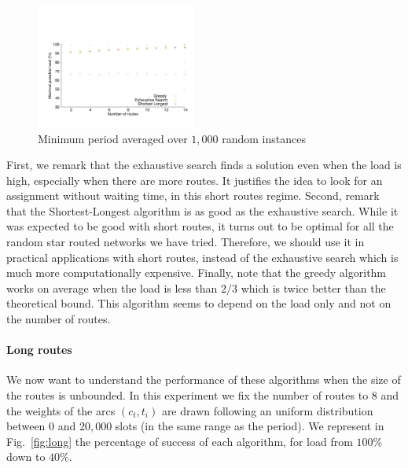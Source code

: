 \documentclass[10pt, conference, letterpaper]{IEEEtran}
\begin{document}
        
      \begin{figure}[h]
      \begin{center}
	 \includegraphics[width=0.47\textwidth]{periode_petite.pdf}
      \end{center}
         \vspace{-0.5cm}
      \caption{Minimum period averaged over $1,000$ random instances}\label{fig:short}
      \end{figure}
      First, we remark that the exhaustive search finds a solution even when the load is high, especially when there are more routes.
      It justifies the idea to look for an assignment without waiting time, in this short routes regime.
      Second, remark that the Shortest-Longest algorithm is as good as the exhaustive search. While it was expected to be good with short routes, it turns out to be optimal for all the random star routed networks we have tried. Therefore, we should use it in practical applications with short routes, instead of the exhaustive search which is much more computationally expensive. 
      Finally, note that the greedy algorithm works on average when the load is less than $2/3$ which is twice better than the theoretical bound. This algorithm seems to depend on the load only and not on the number of routes.
      
        \paragraph{Long routes}
      
      We now want to understand the performance of these algorithms when the size of the routes is unbounded. In this experiment we fix the number of routes to $8$ and the weights of the arcs $(c_t,t_i)$ are drawn following an uniform distribution between $0$ and $20,000$ slots (in the same range as the period). We represent in Fig.~\ref{fig:long} the percentage of success of each algorithm, for load from $100\%$ down to $40\%$.
      
\end{document}
